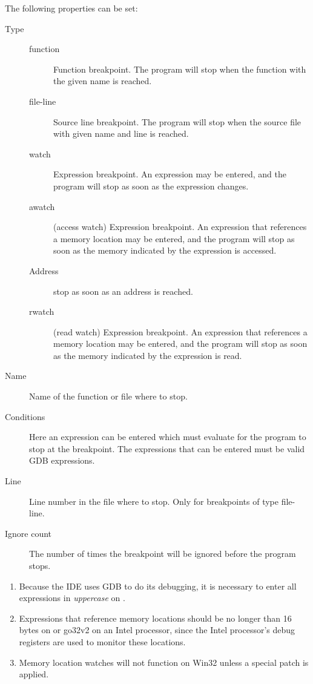 The following properties can be set:
\begin{description}
\item[Type]
\begin{description}
\item[function] Function breakpoint. The program will stop when the function
with the given name is reached.
\item[file-line] Source line breakpoint. The program will stop when the
source file with given name and line is reached.
\item[watch] Expression breakpoint. An expression may be entered, and the
program will stop as soon as the expression changes.
\item[awatch] (access watch) Expression breakpoint. An expression that references a
memory location may be entered, and the program will stop as soon as
the memory indicated by the expression is accessed.
\item[Address] stop as soon as an address is reached.
\item[rwatch] (read watch) Expression breakpoint. An expression that references a
memory location may be entered, and the program will stop as soon as
the memory indicated by the expression is read.
\end{description}
\item[Name] Name of the function or file where to stop.
\item[Conditions] Here an expression can be entered which must evaluate
 for the program to stop at the breakpoint. The expressions that
can be entered must be valid GDB expressions.
\item[Line] Line number in the file where to stop. Only for breakpoints of
type file-line.
\item[Ignore count] The number of times the breakpoint will be ignored
before the program stops.
\end{description}
\begin{remark}
\begin{enumerate}
\item Because the IDE uses GDB to do its debugging, it is necessary to enter all
expressions in {\em uppercase} on \freebsd.
\item Expressions that reference memory locations should be no longer than 16
bytes on \linux or go32v2 on an Intel processor, since the Intel processor's
debug registers are used to monitor these locations.
\item Memory location watches will not function on Win32 unless a special
patch is applied.
\end{enumerate}
\end{remark}

